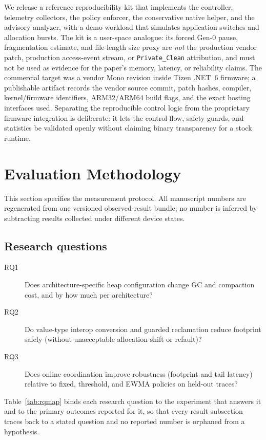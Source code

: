 \documentclass[acmsmall,screen]{acmart}
\begin{document}
We release a reference reproducibility kit that implements the controller,
telemetry collectors, the policy enforcer, the conservative native helper,
and the advisory analyzer, with a demo workload that simulates application
switches and allocation bursts. The kit is a user-space analogue: its
forced Gen-0 pause, fragmentation estimate, and file-length size proxy are
\emph{not} the production vendor patch, production access-event stream, or
\texttt{Private\_Clean} attribution, and must not be used as evidence for
the paper's memory, latency, or reliability claims. The commercial target
was a vendor Mono revision inside Tizen .NET~6 firmware; a publishable
artifact records the vendor source commit, patch hashes, compiler,
kernel/firmware identifiers, ARM32/ARM64 build flags, and the exact hosting
interfaces used. Separating the reproducible control logic from the
proprietary firmware integration is deliberate: it lets the control-flow,
safety guards, and statistics be validated openly without claiming binary
transparency for a stock runtime.

\section{Evaluation Methodology}
\label{sec:method}

This section specifies the measurement protocol. All manuscript numbers are
regenerated from one versioned observed-result bundle; no number is inferred
by subtracting results collected under different device states.

\subsection{Research questions}
\begin{description}
  \item[RQ1] Does architecture-specific heap configuration change GC and
  compaction cost, and by how much per architecture?
  \item[RQ2] Do value-type interop conversion and guarded reclamation
  reduce footprint safely (without unacceptable allocation shift or
  refault)?
  \item[RQ3] Does online coordination improve robustness (footprint and
  tail latency) relative to fixed, threshold, and EWMA policies on held-out
  traces?
\end{description}
Table~\ref{tab:rqmap} binds each research question to the experiment that
answers it and to the primary outcomes reported for it, so that every result
subsection traces back to a stated question and no reported number is
orphaned from a hypothesis.
\end{document}
